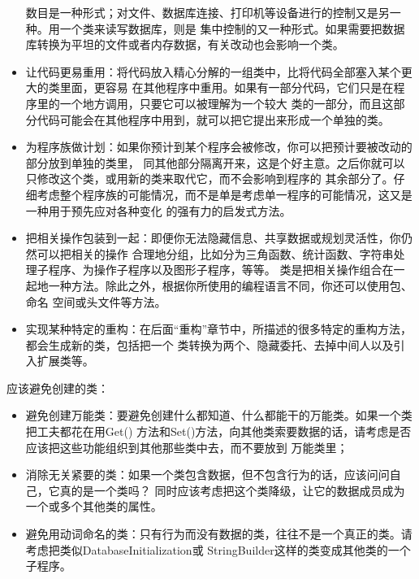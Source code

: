 \documentclass{article}
\begin{document}
\begin{itemize}
    数目是一种形式；对文件、数据库连接、打印机等设备进行的控制又是另一种。用一个类来读写数据库，则是
    集中控制的又一种形式。如果需要把数据库转换为平坦的文件或者内存数据，有关改动也会影响一个类。
    \item 让代码更易重用：将代码放入精心分解的一组类中，比将代码全部塞入某个更大的类里面，更容易
    在其他程序中重用。如果有一部分代码，它们只是在程序里的一个地方调用，只要它可以被理解为一个较大
    类的一部分，而且这部分代码可能会在其他程序中用到，就可以把它提出来形成一个单独的类。
    \item 为程序族做计划：如果你预计到某个程序会被修改，你可以把预计要被改动的部分放到单独的类里，
    同其他部分隔离开来，这是个好主意。之后你就可以只修改这个类，或用新的类来取代它，而不会影响到程序的
    其余部分了。仔细考虑整个程序族的可能情况，而不是单是考虑单一程序的可能情况，这又是一种用于预先应对各种变化
    的强有力的启发式方法。
    \item 把相关操作包装到一起：即便你无法隐藏信息、共享数据或规划灵活性，你仍然可以把相关的操作
    合理地分组，比如分为三角函数、统计函数、字符串处理子程序、为操作子程序以及图形子程序，等等。
    类是把相关操作组合在一起地一种方法。除此之外，根据你所使用的编程语言不同，你还可以使用包、命名
    空间或头文件等方法。
    \item 实现某种特定的重构：在后面“重构”章节中，所描述的很多特定的重构方法，都会生成新的类，包括把一个
    类转换为两个、隐藏委托、去掉中间人以及引入扩展类等。
\end{itemize}

\par
应该避免创建的类：
\begin{itemize}
    \item 避免创建万能类：要避免创建什么都知道、什么都能干的万能类。如果一个类把工夫都花在用Get()
    方法和Set()方法，向其他类索要数据的话，请考虑是否应该把这些功能组织到其他那些类中去，而不要放到
    万能类里；
    \item 消除无关紧要的类：如果一个类包含数据，但不包含行为的话，应该问问自己，它真的是一个类吗？
    同时应该考虑把这个类降级，让它的数据成员成为一个或多个其他类的属性。
    \item 避免用动词命名的类：只有行为而没有数据的类，往往不是一个真正的类。请考虑把类似DatabaseInitialization或
    StringBuilder这样的类变成其他类的一个子程序。
\end{itemize}
\end{document}
